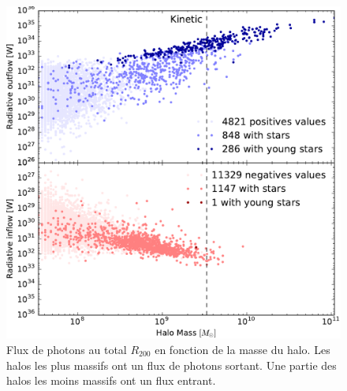 \begin{figure}
	\includegraphics[height=.30\textheight]{img/03/flux_rad_kinetic.pdf} 
    \caption[Flux de photons au $R_{200}$]{Flux de photons au total $R_{200}$ en fonction de la masse du halo. 
    Les halos les plus massifs ont un flux de photons sortant. 
    Une partie des halos les moins massifs ont un flux entrant.}
 	\label{fig:R200rad}
\end{figure}


